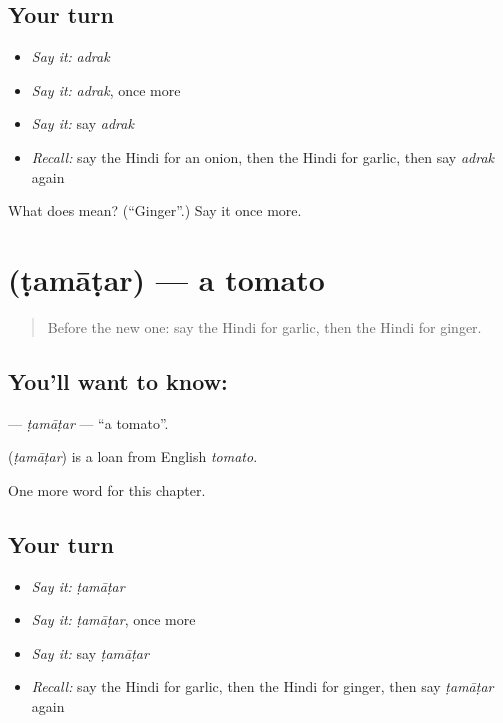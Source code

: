 \subsection*{Your turn}
\begin{itemize}
\raggedright
  \item \emph{Say it:} \emph{adrak}
  \item \emph{Say it:} \emph{adrak}, once more
  \item \emph{Say it:} say \emph{adrak}
  \item \emph{Recall:} say the Hindi for an onion, then the Hindi for garlic, then say \emph{adrak} again
\end{itemize}

\begin{tcolorbox}[breakable,colback=teal!4,colframe=teal!35!black,title={Before you move on}]
What does  mean? (\textquotedblleft{}Ginger\textquotedblright{}.) Say it once more.
\end{tcolorbox}
\section[\texorpdfstring{\hi{टमाटर} (ṭamāṭar)}{टमाटर (ṭamāṭar)}]{ (ṭamāṭar) — a tomato}

\label{lesson:HI-C138-tamatar}



\begin{quote}
Before the new one: say the Hindi for garlic, then the Hindi for ginger.
\end{quote}

\subsection*{You'll want to know: }
\textbf{} — \emph{ṭamāṭar} — \textquotedblleft{}a tomato\textquotedblright{}.

\begin{cousinweb}
\textbf{} (\emph{ṭamāṭar}) is a loan from English \emph{tomato}.
\end{cousinweb}

\begin{grammarlens}[title={What you've built}]
One more word for this chapter.
\end{grammarlens}

\subsection*{Your turn}
\begin{itemize}
\raggedright
  \item \emph{Say it:} \emph{ṭamāṭar}
  \item \emph{Say it:} \emph{ṭamāṭar}, once more
  \item \emph{Say it:} say \emph{ṭamāṭar}
  \item \emph{Recall:} say the Hindi for garlic, then the Hindi for ginger, then say \emph{ṭamāṭar} again
\end{itemize}

